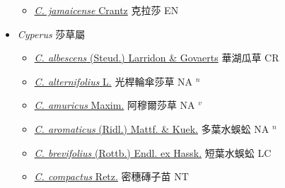 \begin{itemize}
  \begin{itemize}
        \item[] \href{http://www.theplantlist.org/tpl1.1/search?q=Cladium+jamaicense}{\textit{C. jamaicense} Crantz}   克拉莎 EN
  \end{itemize}
 \item[] \textit{Cyperus} 莎草屬
                    
  \begin{itemize}
        \item[] \href{http://www.theplantlist.org/tpl1.1/search?q=Cyperus+albescens}{\textit{C. albescens} (Steud.) Larridon \& Govaerts}     華湖瓜草 CR
        \item[] \href{http://www.theplantlist.org/tpl1.1/search?q=Cyperus+alternifolius}{\textit{C. alternifolius} L.}   光桿輪傘莎草 NA $^n$
        \item[] \href{http://www.theplantlist.org/tpl1.1/search?q=Cyperus+amuricus}{\textit{C. amuricus} Maxim.}   阿穆爾莎草 NA $^v$
        \item[] \href{http://www.theplantlist.org/tpl1.1/search?q=Cyperus+aromaticus}{\textit{C. aromaticus} (Ridl.) Mattf. \& Kuek.}     多葉水蜈蚣 NA $^n$
        \item[] \href{http://www.theplantlist.org/tpl1.1/search?q=Cyperus+brevifolius}{\textit{C. brevifolius} (Rottb.) Endl. ex Hassk.}     短葉水蜈蚣 LC
        \item[] \href{http://www.theplantlist.org/tpl1.1/search?q=Cyperus+compactus}{\textit{C. compactus} Retz.}     密穗磚子苗 NT

\end{itemize}
\end{itemize}
